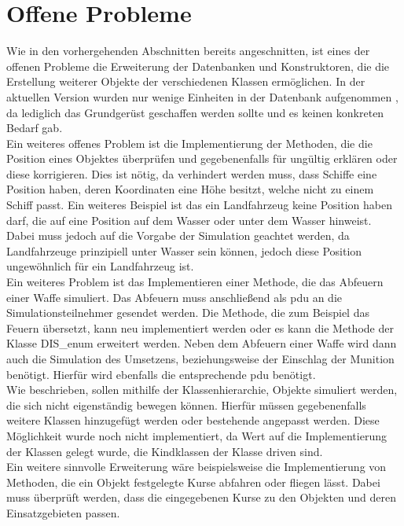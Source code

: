 \section{Offene Probleme}\label{prob}
Wie in den vorhergehenden Abschnitten bereits angeschnitten, ist eines der offenen Probleme die Erweiterung der Datenbanken und Konstruktoren, die die Erstellung weiterer Objekte der verschiedenen Klassen ermöglichen. In der aktuellen Version wurden nur wenige Einheiten in der Datenbank aufgenommen , da lediglich das Grundgerüst geschaffen werden sollte und es keinen konkreten Bedarf gab. \\
Ein weiteres offenes Problem ist die Implementierung der Methoden, die die Position eines Objektes überprüfen und gegebenenfalls für ungültig erklären oder diese korrigieren.  Dies ist nötig, da verhindert werden muss, dass Schiffe eine Position haben, deren Koordinaten eine Höhe besitzt, welche nicht zu einem Schiff passt. Ein weiteres Beispiel ist das ein Landfahrzeug  keine Position haben darf, die auf eine Position auf dem Wasser oder unter dem Wasser hinweist. Dabei muss jedoch auf die Vorgabe der Simulation geachtet werden, da Landfahrzeuge prinzipiell unter Wasser sein können, jedoch diese Position ungewöhnlich für ein Landfahrzeug ist.\\
Ein weiteres Problem ist das Implementieren einer Methode, die das Abfeuern einer Waffe simuliert. Das Abfeuern muss anschließend als \ac{pdu} an die Simulationsteilnehmer gesendet werden. Die Methode, die zum Beispiel das Feuern übersetzt, kann neu implementiert werden oder es kann die Methode der Klasse \glqq DIS\_enum\grqq{} erweitert werden. Neben dem Abfeuern einer Waffe wird dann auch die Simulation des Umsetzens, beziehungsweise der Einschlag der Munition benötigt. Hierfür wird ebenfalls die entsprechende  \ac{pdu} benötigt.\\
Wie beschrieben, sollen mithilfe der Klassenhierarchie, Objekte simuliert werden, die sich nicht eigenständig bewegen können. Hierfür müssen gegebenenfalls weitere Klassen hinzugefügt werden oder bestehende angepasst werden. Diese Möglichkeit wurde noch nicht implementiert, da Wert auf die Implementierung der Klassen gelegt wurde, die Kindklassen der Klasse  \glqq driven\grqq{} sind. \\
Ein weitere sinnvolle Erweiterung wäre beispielsweise die Implementierung von Methoden, die ein Objekt festgelegte Kurse abfahren oder fliegen lässt. Dabei muss überprüft werden, dass die eingegebenen Kurse zu den Objekten und deren Einsatzgebieten passen. 

